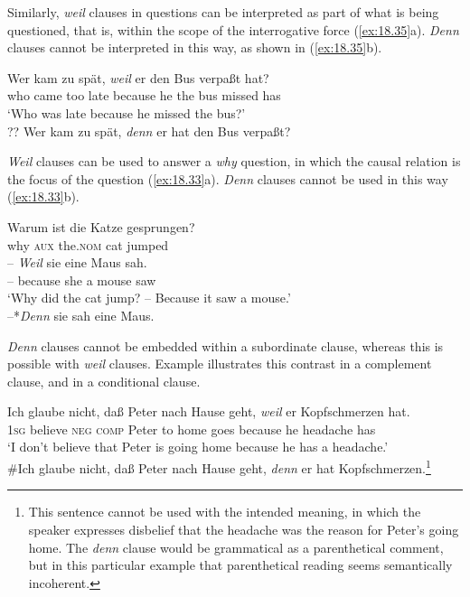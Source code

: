 Similarly, \textit{weil} clauses in questions can be interpreted as part of what is being questioned, that is, within the scope of the interrogative force (\ref{ex:18.35}a). \textit{Denn} clauses cannot be interpreted in this way, as shown in (\ref{ex:18.35}b).


\ea \label{ex:18.35}
\ea \gll  Wer kam zu spät, \textit{weil} er den Bus verpaßt hat?\\
who  came  too  late  because  he the bus missed has \\
\glt ‘Who was late because he missed the bus?’ \\
\ex ?? Wer kam zu spät, \textit{denn} er hat den Bus verpaßt?
                       \z
\z


\textit{Weil} clauses can be used to answer a \textit{why} question, in which the causal relation is the focus of the question (\ref{ex:18.33}a). \textit{Denn} clauses cannot be used in this way (\ref{ex:18.33}b).


\ea \label{ex:18.33}
\ea  \gll Warum  ist  die  Katze  gesprungen? \\
why  \textsc{aux}  the.\textsc{nom}  cat  jumped \\
\newline
\gll – \textit{Weil}  sie  eine  Maus  sah. \\
 –  because  she  a  mouse  saw\\
\glt ‘Why did the cat jump? – Because it saw a mouse.’ \\
\ex  –*\textit{Denn} sie sah eine Maus.
\z \z



\textit{Denn} clauses cannot be embedded within a subordinate clause, whereas this is possible with \textit{weil} clauses. Example  illustrates this contrast in a complement clause, and  in a conditional clause.


\ea \label{ex:18.36}
\ea   \gll Ich  glaube  nicht,  daß  Peter  nach  Hause  geht,  \textit{weil}  er  Kopfschmerzen  hat.\\
\textsc{1sg}  believe  \textsc{neg}  \textsc{comp}  Peter  to  home  goes  because  he  headache  has\\
\glt ‘I don’t believe that Peter is going home because he has a headache.’ \\
\ex  \#Ich glaube nicht, daß Peter nach Hause geht, \textit{denn} er hat Kopfschmerzen.\footnote{This sentence cannot be used with the intended meaning, in which the speaker expresses disbelief that the headache was the reason for Peter’s going home. The \textit{denn} clause would be grammatical as a parenthetical comment, but in this particular example that parenthetical reading seems semantically incoherent.}
\z \z

